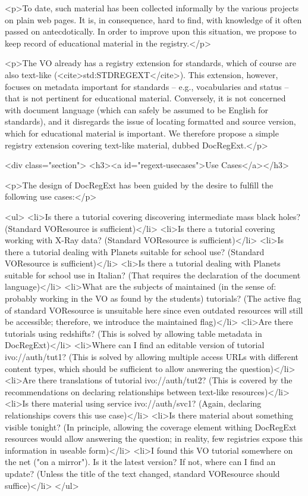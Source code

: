 <p>To date, such material has been collected informally by the various
projects on plain web pages.  It is, in consequence, hard to find, with
knowledge of it often passed on antecdotically. In order to improve upon 
this situation, we
propose to keep record of educational material in the registry.</p>

<p>The VO already has a registry extension for standards, which of
course are also text-like (<cite>std:STDREGEXT</cite>).  This extension,
however, focuses on metadata important for standards – e.g.,
vocabularies and status – that is not pertinent for educational
material.  Conversely, it is not concerned with document language (which
can safely be assumed to be English for standards), and it disregards
the issue of locating formatted and source version, which for educational
material is important.  We therefore propose a simple registry extension
covering text-like material, dubbed DocRegExt.</p>


<div class="section">
<h3><a id="regext-usecases">Use Cases</a></h3>

<p>The design of DocRegExt has been guided by the desire to fulfill the
following use cases:</p>

<ul>
<li>Is there a tutorial covering discovering intermediate mass black
holes? (Standard VOResource is sufficient)</li>
<li>Is there a tutorial covering working with X-Ray data? (Standard
VOResource is sufficient)</li>
<li>Is there a tutorial dealing with Planets suitable for school use?
(Standard VOResource is sufficient)</li>
<li>Is there a tutorial dealing with Planets suitable for school use in
Italian? (That requires the declaration of the document language)</li>
<li>What are the subjects of maintained (in the sense of: probably
working in the VO as found by the students) tutorials?
(The active flag of standard VOResource is
unsuitable here since even outdated resources will still be accessible;
therefore, we introduce the maintained flag)</li>
<li>Are there tutorials using redshifts? (This is solved by allowing
table metadata in DocRegExt)</li>
<li>Where can I find an editable version of tutorial ivo://auth/tut1?
(This is solved by allowing multiple access URLs with different content
types, which should be sufficient to allow answering the question)</li>
<li>Are there translations of tutorial ivo://auth/tut2? (This is covered
by the recommendations on declaring relationships between text-like
resources)</li>
<li>Is there material using service ivo://auth/svc1? (Again, declaring
relationships covers this use case)</li>
<li>Is there material about something visible tonight? (In principle,
allowing the coverage element withing DocRegExt resources would allow
answering the question; in reality, few registries expose this
information in useable form)</li>
<li>I found this VO tutorial somewhere on the net ("on a mirror").  Is it
the latest version?  If not, where can I find an update? (Unless the
title of the text changed, standard VOResource should suffice)</li>
</ul>

